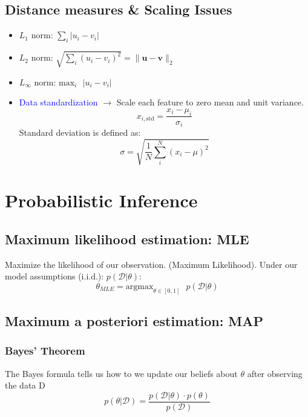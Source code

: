\documentclass[a4paper,10pt,twoside=true,DIV=10,headsepline,plainheadsepline]{scrartcl}
\begin{document}
	\subsection{Distance measures \& Scaling Issues}
		\begin{itemize}
 					\item $L_1$ norm: $\sum_i | u_i - v_i |$
					\item $L_2$ norm: $\sqrt{\sum_i (u_i - v_i)^2} = \| \mathbf{u} - \mathbf{v} \|_2$
					\item $L_{\infty}$ norm: $\textrm{max}_i \textrm{ } | u_i - v_i |$					
					\item \textcolor{blue}{Data standardization} $\rightarrow$ Scale each feature to zero mean and unit variance.
					\begin{equation}
						x_{i, \textrm{std}} = \frac{x_i - \mu_i}{\sigma_i}
					\end{equation}
		Standard deviation is defined as:
					\begin{equation}
						\sigma = \sqrt{\frac{1}{N} \sum_i^N (x_i - \mu)^2}
					\end{equation}
					
		\end{itemize}
	

	\section{Probabilistic Inference}
	\subsection{Maximum likelihood estimation: MLE}
	Maximize the likelihood of our observation. (Maximum Likelihood). Under our model assumptions (i.i.d.): $p( \mathcal{D}| \theta)$:
		\begin{equation}
			\theta_{MLE} = \textrm{argmax}_{\theta \in [0,1]} \textrm{ } p( \mathcal{D}| \theta)
		\end{equation}

	\subsection{Maximum a posteriori estimation: MAP}
	\subsubsection{Bayes' Theorem}
	The Bayes formula tells us how to we update our beliefs about $\theta$ after observing the data D
		\begin{equation}
			p( \theta | \mathcal{D}) = \frac{p(\mathcal{D}|\theta) \cdot p(\theta)}{p(\mathcal{D})}
		\end{equation}
\end{document}
